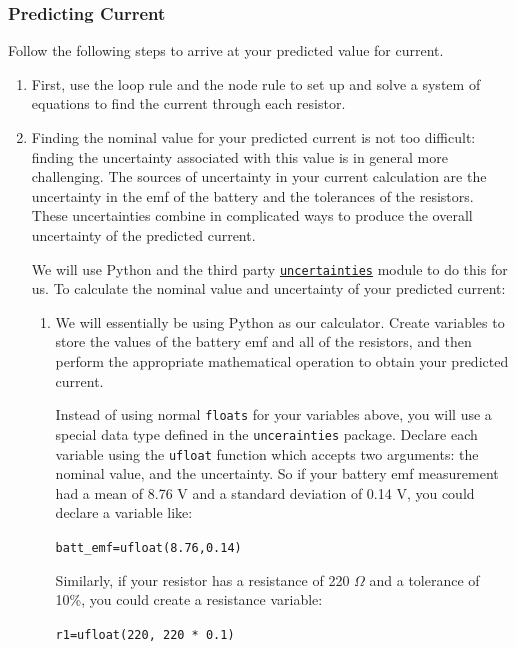 \documentclass[12pt]{article}
\begin{document}
	\subsubsection*{Predicting Current}
	Follow the following steps to arrive at your predicted value for current.
	\begin{enumerate}
		\item First, use the loop rule and the node rule to set up and solve a system of equations to find the current through each resistor.
		\item Finding the nominal value for your predicted current is not too difficult: finding the uncertainty associated with this value is in general more challenging. The sources of uncertainty in your current calculation are the uncertainty in the emf of the battery and the tolerances of the resistors. These uncertainties combine in complicated ways to produce the overall uncertainty of the predicted current.
		
		We will use Python and the third party \href{https://pythonhosted.org/uncertainties/}{\texttt{uncertainties}} module to do this for us. To calculate the nominal value and uncertainty of your predicted current:
		\begin{enumerate}
			\item We will essentially be using Python as our calculator. Create variables to store the values of the battery emf and all of the resistors, and then perform the appropriate mathematical operation to obtain your predicted current.
			
			Instead of using normal \texttt{floats} for your variables above, you will use a special data type defined in the \texttt{uncerainties} package. Declare each variable using the \texttt{ufloat} function which accepts two arguments: the nominal value, and the uncertainty. So if your battery emf measurement had a mean of 8.76 V and a standard deviation of 0.14 V, you could declare a variable like:\\ 
			\begin{center}
			\texttt{batt\_emf=ufloat(8.76,0.14)}
			\end{center}
			Similarly, if your resistor has a resistance of 220 $\Omega$ and a tolerance of 10\%, you could create a resistance variable:\\
			\begin{center}
				\texttt{r1=ufloat(220, 220 * 0.1)}
			\end{center}
		\end{enumerate}
	

\end{enumerate}
\end{document}
